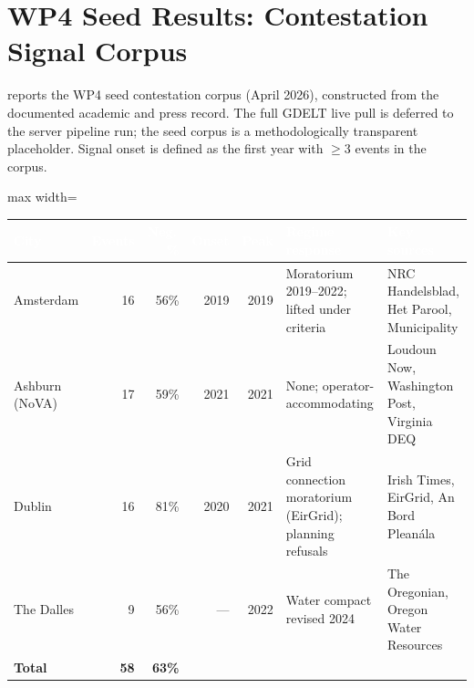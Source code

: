 \section{WP4 Seed Results: Contestation Signal Corpus}
\label{app:wp4results}

 reports the WP4 seed contestation corpus (April 2026), constructed
from the documented academic and press record. The full GDELT live pull is deferred to
the server pipeline run; the seed corpus is a methodologically transparent placeholder.
Signal onset is defined as the first year with $\geq 3$ events in the corpus.

\begin{fullwidth}
\small
{}
\setlength{\tabcolsep}{5pt}
\renewcommand{\arraystretch}{1.4}
\begin{adjustbox}{max width=\linewidth}
\begin{tabular}{>{\raggedright}p{2.8cm}rrrr>{\raggedright}p{3.0cm}>{\raggedright\arraybackslash}p{4.2cm}}
\toprule
\rowcolor{dcblue}
\textcolor{white}{\textbf{City}} &
\textcolor{white}{\textbf{Events}} &
\textcolor{white}{\textbf{Neg.\,\%}} &
\textcolor{white}{\textbf{Onset}} &
\textcolor{white}{\textbf{Peak}} &
\textcolor{white}{\textbf{Regime response}} &
\textcolor{white}{\textbf{Key sources}} \\
\midrule
Amsterdam & 16 & 56\% & 2019 & 2019 & Moratorium 2019--2022; lifted under criteria & NRC Handelsblad, Het Parool, Municipality \\
\addlinespace[2pt]
\rowcolor{dcgray}
Ashburn (NoVA) & 17 & 59\% & 2021 & 2021 & None; operator-accommodating & Loudoun Now, Washington Post, Virginia DEQ \\
\addlinespace[2pt]
Dublin & 16 & 81\% & 2020 & 2021 & Grid connection moratorium (EirGrid); planning refusals & Irish Times, EirGrid, An Bord Pleanála \\
\addlinespace[2pt]
\rowcolor{dcgray}
The Dalles & 9 & 56\% & --- & 2022 & Water compact revised 2024 & The Oregonian, Oregon Water Resources \\
\midrule
\textbf{Total} & \textbf{58} & \textbf{63\%} & & & & \\

\end{tabular}
\end{adjustbox}
\end{fullwidth}
